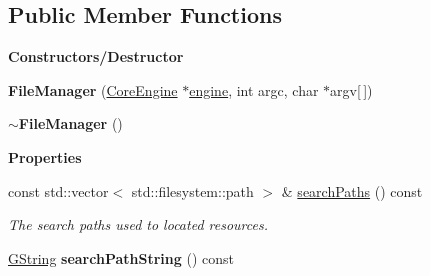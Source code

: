 \subsection*{Public Member Functions}
\begin{Indent}\textbf{ Constructors/\+Destructor}\par
\begin{DoxyCompactItemize}
\item 
\mbox{\label{classrev_1_1_file_manager_ad827da7c48e0439e61e3d7d900a60d57}} 
{\bfseries File\+Manager} (\mbox{\hyperlink{classrev_1_1_core_engine}{Core\+Engine}} $\ast$\mbox{\hyperlink{classrev_1_1_manager_a0fbd0df6b4f3caf42b557f9702f48171}{engine}}, int argc, char $\ast$argv\mbox{[}$\,$\mbox{]})
\item 
\mbox{\label{classrev_1_1_file_manager_a417917f3c4e94c52ff655d6b30bceb3d}} 
{\bfseries $\sim$\+File\+Manager} ()
\end{DoxyCompactItemize}
\end{Indent}
\begin{Indent}\textbf{ Properties}\par
\begin{DoxyCompactItemize}
\item 
\mbox{\label{classrev_1_1_file_manager_a0080565309419d2d5efceb3a89bd8b99}} 
const std\+::vector$<$ std\+::filesystem\+::path $>$ \& \mbox{\hyperlink{classrev_1_1_file_manager_a0080565309419d2d5efceb3a89bd8b99}{search\+Paths}} () const
\begin{DoxyCompactList}\small\item\em The search paths used to located resources. \end{DoxyCompactList}\item 
\mbox{\label{classrev_1_1_file_manager_a0c7e7c95ae5cae1a08cf4b79f1872e7d}} 
\mbox{\hyperlink{classrev_1_1_g_string}{G\+String}} {\bfseries search\+Path\+String} () const
\end{DoxyCompactItemize}
\end{Indent}
